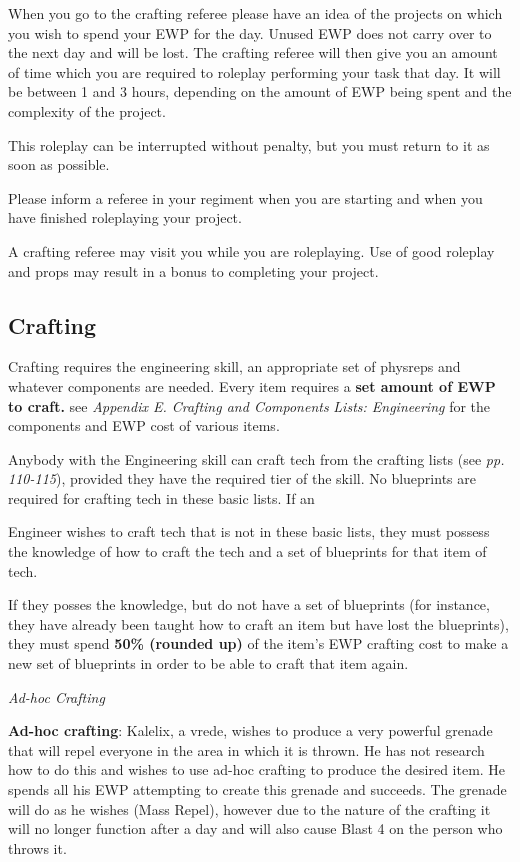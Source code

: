 When you go to the crafting referee please have an idea of the projects on which you wish to spend your EWP for the day. Unused EWP does not carry over to the next day and will be lost. The crafting referee will then give you an amount of time which you are required to roleplay performing your task that day. It will be between 1 and 3 hours, depending on the amount of EWP being spent and the complexity of the project.

This roleplay can be interrupted without penalty, but you must return to it as soon as possible.

Please inform a referee in your regiment when you are starting and when you have finished roleplaying your project.

A crafting referee may visit you while you are roleplaying. Use of good roleplay and props may result in a bonus to completing your project.

\subsection{Crafting}

Crafting requires the engineering skill, an appropriate set of physreps and whatever components are needed. Every item requires a \textbf{set amount of EWP to craft.} see \textit{Appendix E. Crafting and Components} \textit{Lists: Engineering} for the components and EWP cost of various items.

Anybody with the Engineering skill can craft tech from the crafting lists (see \textit{pp. 110-115}), provided they have the required tier of the skill. No blueprints are required for crafting tech in these basic lists. If an

Engineer wishes to craft tech that is not in these basic lists, they must possess the knowledge of how to craft the tech and a set of blueprints for that item of tech.

If they posses the knowledge, but do not have a set of blueprints (for instance, they have already been taught how to craft an item but have lost the blueprints), they must spend \textbf{50\% (rounded up)} of the item's EWP crafting cost to make a new set of blueprints in order to be able to craft that item again.

\textit{Ad-hoc Crafting}

\textbf{Ad-hoc crafting}: Kalelix, a vrede, wishes to produce a very powerful grenade that will repel everyone in the area in which it is thrown. He has not research how to do this and wishes to use ad-hoc crafting to produce the desired item. He spends all his EWP attempting to create this grenade and succeeds. The grenade will do as he wishes (Mass Repel), however due to the nature of the crafting it will no longer function after a day and will also cause Blast 4 on the person who throws it.

